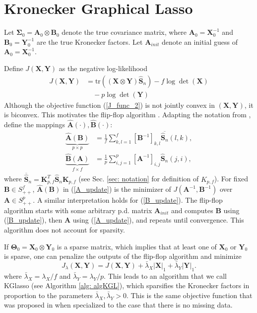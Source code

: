 \documentclass[journal,11pt,draftcls,onecolumn]{IEEEtran}
\def\tr{{\rm tr}}
\def\bA{ {\mathbf{A}} }
\def\bB{ {\mathbf{B}} }
\def\bK{ {\mathbf{K}} }
\def\bS{ {\mathbf{S}} }
\def\bX{ {\mathbf{X}} }
\def\bY{ {\mathbf{Y}} }
\def\bTheta{ {\mathbf{\Theta}} }
\def\tr{{ \text{tr}   }}
\begin{document}
\section{Kronecker Graphical Lasso} \label{sec: algorithm}
Let $\mathbf{\Sigma}_0=\mathbf{A}_0 \otimes \mathbf{B}_0$ denote the true covariance matrix, where $\mathbf{A}_0=\mathbf{X}_0^{-1}$ and $\mathbf{B}_0=\mathbf{Y}_0^{-1}$ are the true Kronecker factors. Let $\mathbf{A}_{init}$ denote an initial guess of $\mathbf{A}_0=\mathbf{X}_0^{-1}$.

Define $J(\bX,\bY)$ as the negative log-likelihood
\begin{align}
	J(\bX,\bY) &= \tr((\bX \otimes \bY)\hat{\bS}_n) - f \log\det(\bX) \nonumber \\
		& \quad -p \log\det(\bY) \label{J_func_2}
\end{align}
Although the objective function (\ref{J_func_2}) is not jointly convex in $(\bX, \bY)$, it is biconvex. This motivates the flip-flop algorithm \cite{EstCovMatKron}. 
%
Adapting the notation from \cite{EstCovMatKron}, define the mappings $\hat{\mathbf{A}}(\cdot), \hat{\mathbf{B}}(\cdot)$:
\begin{align}
	\underbrace{\hat{\mathbf{A}}(\mathbf{B})}_{p\times p} &= \frac{1}{f} \sum_{k,l=1}^f{[\mathbf{B}^{-1}]_{k,l}\overline{\hat{\mathbf{S}}_n}(l,k)}, \label{A_update} \\
	\underbrace{\hat{\mathbf{B}}(\mathbf{A})}_{f\times f} &= \frac{1}{p} \sum_{i,j=1}^p{[\mathbf{A}^{-1}]_{i,j} \hat{\mathbf{S}}_n(j,i)}, \label{B_update}
\end{align}
where $\overline{\hat{\bS}}_n=\bK_{p,f}^T \hat{\bS}_n \bK_{p,f}$ (see Sec. \ref{sec: notation} for definition of $K_{p,f}$). For fixed $\bB\in S_{++}^f$, $\hat{\bA}(\bB)$ in (\ref{A_update}) is the minimizer of $J(\bA^{-1},\bB^{-1})$ over $\bA\in S_{++}^p$. A similar interpretation holds for (\ref{B_update}). The flip-flop algorithm starts with some arbitrary p.d. matrix $\bA_{init}$ and computes $\bB$ using (\ref{B_update}), then $\bA$ using (\ref{A_update}), and repeats until convergence. This algorithm does not account for sparsity.

If $\bTheta_0=\bX_0\otimes \bY_0$ is a sparse matrix, which implies that at least one of $\bX_0$ or $\bY_0$ is sparse, one can penalize the outputs of the flip-flop algorithm and minimize
\begin{equation} \label{J_lambda_func}
	J_\lambda(\bX,\bY) = J(\bX,\bY) + \bar{\lambda}_X |\bX|_1 + \bar{\lambda}_Y |\bY|_1 .
\end{equation}
where $\bar{\lambda}_X=\lambda_X/f$ and $\bar{\lambda}_Y=\lambda_Y/p$. This leads to an algorithm that we call KGlasso (see Algorithm \ref{alg: algKGL}), which sparsifies the Kronecker factors in proportion to the parameters $\bar{\lambda}_X, \bar{\lambda}_Y >0$. This is the same objective function that was proposed in \cite{AllenTib10} when specialized to the case that there is no missing data.
\end{document}

